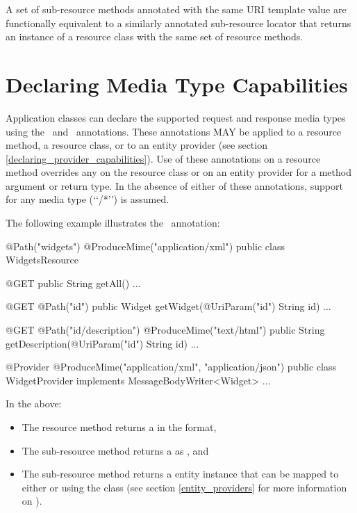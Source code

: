 \begin{nnnote}A set of sub-resource methods annotated with the same URI template value are functionally equivalent to a similarly annotated sub-resource locator that returns an instance of a resource class with the same set of resource methods.\end{nnnote}

\section{Declaring Media Type Capabilities}
\label{declaring_method_capabilities}

Application classes can declare the supported request and response media types using the \ProduceMime\ and \ConsumeMime\ annotations. These annotations MAY be applied to a resource method, a resource class, or to an entity provider (see section \ref{declaring_provider_capabilities}). Use of these annotations on a resource method overrides any on the resource class or on an entity provider for a method argument or return type. In the absence of either of these annotations, support for any media type (\lq\lq*/*\rq\rq) is assumed.

The following example illustrates the \ProduceMime\ annotation:

\begin{listing}{1}
@Path("widgets")
@ProduceMime("application/xml")
public class WidgetsResource {
  
  @GET
  public String getAll() {...}
  
  @GET
  @Path("{id}")
  public Widget getWidget(@UriParam("id") String id) {...}

  @GET
  @Path("{id}/description")
  @ProduceMime("text/html")
  public String getDescription(@UriParam("id") String id) {...}
}

@Provider
@ProduceMime({"application/xml", "application/json"})
public class WidgetProvider implements MessageBodyWriter<Widget> {...}
\end{listing}

In the above:
\begin{itemize}
\item The  resource method returns a  in the  format, 
\item The  sub-resource method returns a  as , and
\item The  sub-resource method returns a  entity instance that can be mapped to either  or  using the  class (see section \ref{entity_providers} for more information on \MsgWrite).
\end{itemize}

